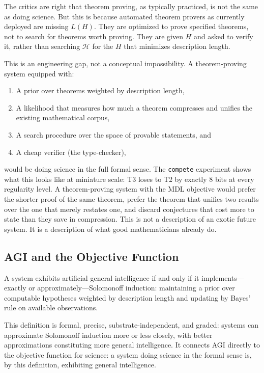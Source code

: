 The critics are right that theorem proving, as typically practiced,
is not the same as doing science. But this is because automated
theorem provers as currently deployed are missing $L(H)$. They are
optimized to prove specified theorems, not to search for theorems
worth proving. They are given $H$ and asked to verify it, rather than
searching $\mathcal{H}$ for the $H$ that minimizes description length.

This is an engineering gap, not a conceptual impossibility. A
theorem-proving system equipped with:
\begin{enumerate}
  \item A prior over theorems weighted by description length,
  \item A likelihood that measures how much a theorem compresses and
        unifies the existing mathematical corpus,
  \item A search procedure over the space of provable statements, and
  \item A cheap verifier (the type-checker),
\end{enumerate}
would be doing science in the full formal sense. The \texttt{compete}
experiment shows what this looks like at miniature scale: T3 loses to
T2 by exactly 8 bits at every regularity level. A theorem-proving
system with the MDL objective would prefer the shorter proof of the
same theorem, prefer the theorem that unifies two results over the one
that merely restates one, and discard conjectures that cost more to
state than they save in compression. This is not a description of an
exotic future system. It is a description of what good mathematicians
already do.

\subsection{AGI and the Objective Function}

\begin{proposition}
  A system exhibits artificial general intelligence if and only if it
  implements---exactly or approximately---Solomonoff induction:
  maintaining a prior over computable hypotheses weighted by description
  length and updating by Bayes' rule on available observations.
\end{proposition}

This definition is formal, precise, substrate-independent, and graded:
systems can approximate Solomonoff induction more or less closely,
with better approximations constituting more general intelligence.
It connects AGI directly to the objective function for science: a
system doing science in the formal sense is, by this definition,
exhibiting general intelligence.

